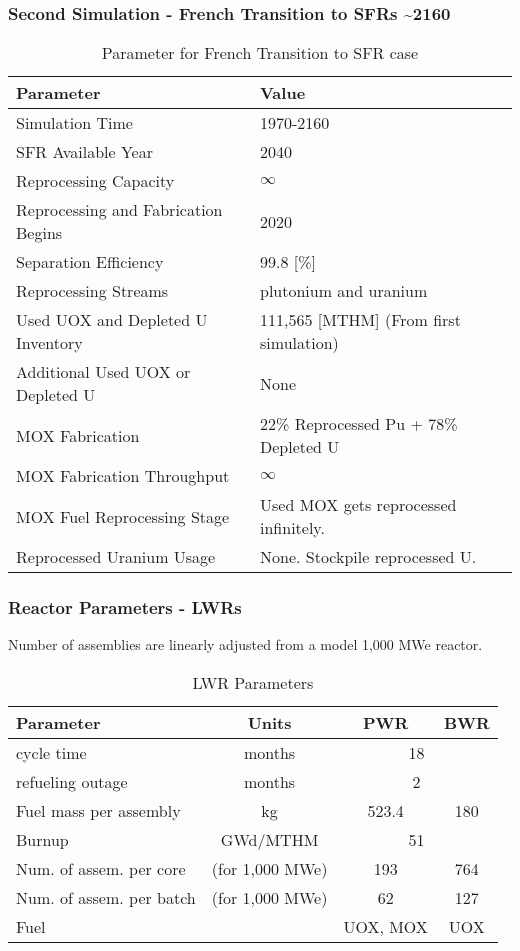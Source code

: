 \begin{frame}
	\frametitle{Second Simulation - French Transition to SFRs \textasciitilde 2160}
	
\begin{table}[h]
	\centering
	\begin{tabularx}{\textwidth}{bb}
		\hline
		Parameter & Value \\
		\hline
		Simulation Time & 1970-2160 \\
		\gls{SFR} Available Year & 2040 \\
		Reprocessing Capacity & $\infty$ \\
		Reprocessing and Fabrication Begins & 2020 \\
		Separation Efficiency & 99.8 [\%] \\
		Reprocessing Streams & plutonium and uranium \\
		\small{Used \gls{UOX} and Depleted U Inventory} & 111,565 [MTHM] {\small (From first simulation)} \\
		\small{Additional Used \gls{UOX} or Depleted U} & None  \\
		\gls{MOX} Fabrication &  \small{22\% Reprocessed Pu + 78\% Depleted U}  \\
		\gls{MOX} Fabrication Throughput & $\infty$ \\
		\gls{MOX} Fuel Reprocessing Stage &  Used \gls{MOX} gets reprocessed infinitely. \\
		Reprocessed Uranium Usage &  None. Stockpile reprocessed U. \\
		\hline
	\end{tabularx}
	\caption {Parameter for French Transition to \gls{SFR} case }
	\label{tab:sim_france}
\end{table}

\end{frame}


\begin{frame}
	\frametitle{Reactor Parameters - \glspl{LWR} }
	Number of assemblies are linearly adjusted from a model 1,000 MWe reactor.
	\begin{table}[h]
    \centering
    \begin{tabularx}{\textwidth}{bccc}
        \hline
        Parameter & Units & PWR & BWR \\
        \hline
        cycle time & months & \multicolumn{2}{c}{18}   \\ 
        refueling outage & months & \multicolumn{2}{c}{2}\\
        Fuel mass per assembly & kg & 523.4 & 180 \\
        Burnup & GWd/MTHM & \multicolumn{2}{c}{51} \\
        \small{Num. of assem. per core} & (for 1,000 MWe) & 193  & 764 \\
        \small{Num. of assem. per batch} & (for 1,000 MWe) & 62 & 127 \\
        Fuel & & \gls{UOX}, \gls{MOX} & \gls{UOX}  \\
        \hline
    \end{tabularx}
    \caption {\gls{LWR} Parameters}
    \label{tab:lwr}
    \end{table}
\end{frame}


